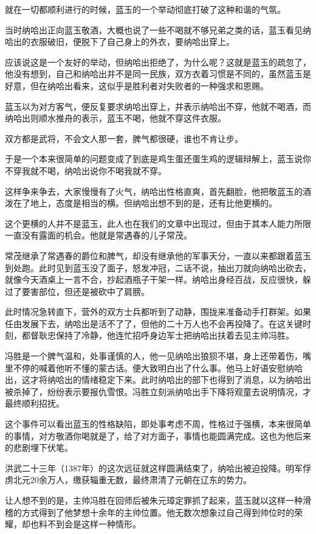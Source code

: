 \begin{multicols}{\theparacolNo}
		就在一切都顺利进行的时候，蓝玉的一个举动彻底打破了这种和谐的气氛。

		当时纳哈出正向蓝玉敬酒，大概也说了一些不喝就不够兄弟之类的话，蓝玉看见纳哈出的衣服破旧，便脱下了自己身上的外衣，要纳哈出穿上。

		应该说这是一个友好的举动，但纳哈出拒绝了，为什么呢？这就是蓝玉的疏忽了，他没有想到，自己和纳哈出并不是同一民族，双方衣着习惯是不同的，虽然蓝玉是好意，但在纳哈出看来，这似乎是胜利者对失败者的一种强求和恩赐。

		蓝玉以为对方客气，便反复要求纳哈出穿上，并表示纳哈出不穿，他就不喝酒，而纳哈出则顺水推舟的表示，蓝玉不喝，他就不穿这件衣服。

		双方都是武将，不会文人那一套，脾气都很硬，谁也不肯让步。

		于是一个本来很简单的问题变成了到底是鸡生蛋还蛋生鸡的逻辑辩解上，蓝玉说你不穿我就不喝，纳哈出说你不喝我就不穿。

		这样争来争去，大家慢慢有了火气，纳哈出性格直爽，首先翻脸，他把敬蓝玉的酒泼在了地上，态度是相当的横。但纳哈出想不到的是，还有比他更横的。

		这个更横的人并不是蓝玉，此人也在我们的文章中出现过，但由于其本人能力所限一直没有露面的机会。他就是常遇春的儿子常茂。

		常茂继承了常遇春的爵位和脾气，却没有继承他的军事天分，一直以来都跟着蓝玉到处跑。此时见到蓝玉没了面子，怒发冲冠，二话不说，抽出刀就向纳哈出砍去，就像今天酒桌上一言不合，抄起酒瓶子干架一样。纳哈出身经百战，反应很快，躲过了要害部位，但还是被砍中了肩膀。

		此时情况急转直下，营外的双方士兵都听到了动静，围拢来准备动手打群架。如果任由发展下去，纳哈出是活不了了，但他的二十万人也不会再投降了。在这关键时刻，都督耿忠保持了冷静，他连忙招呼身边军士把纳哈出扶着去见主帅冯胜。

		冯胜是一个脾气温和，处事谨慎的人，他一见纳哈出狼狈不堪，身上还带着伤，嘴里不停的喊着他听不懂的蒙古话。便大致明白出了什么事。他马上好语安慰纳哈出，这才将纳哈出的情绪稳定下来。此时纳哈出的部下也得到了消息，以为纳哈出被杀掉了，纷纷表示要报仇雪恨。冯胜立刻派纳哈出手下降将观童去说明情况，才最终顺利招抚。

		这个事件可以看出蓝玉的性格缺陷，即处事考虑不周，性格过于强横，本来很简单的事情，对方敬酒你喝就是了，给了对方面子，事情也能圆满完成。这也为他后来的悲剧埋下伏笔。

		洪武二十三年（1387年）的这次远征就这样圆满结束了，纳哈出被迫投降。明军俘虏北元20余万人，缴获辎重无数，最终肃清了元朝在辽东的势力。

		让人想不到的是，主帅冯胜在回师后被朱元璋定罪抓了起来，蓝玉就以这样一种滑稽的方式得到了他梦想十余年的主帅位置。他无数次想象过自己得到帅位时的荣耀，却也料不到会是这样一种情形。


\end{multicols}
